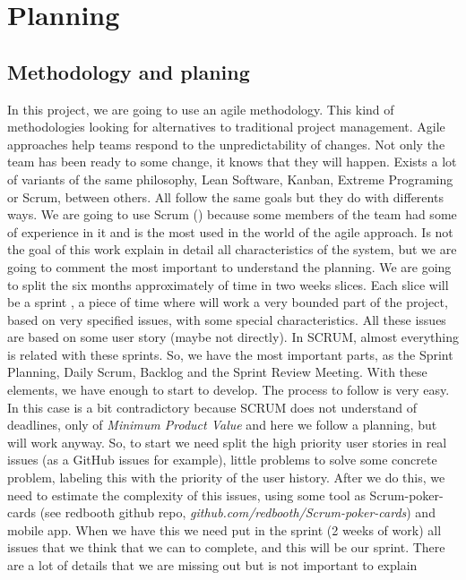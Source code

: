 \chapter{Planning}
\section{Methodology and planing}

In this project, we are going to use an agile methodology.
This kind of methodologies looking for alternatives to traditional project management.
Agile approaches help teams respond to the unpredictability of changes.
Not only the team has been ready to some change, it knows that they will happen.
\intro
Exists a lot of variants of the same philosophy, Lean Software, Kanban,
Extreme Programing or Scrum, between others.
All follow the same goals but they do with differents ways.
\intro
We are going to use Scrum (\cite{scrumbook}) because some members of the team had some of experience
in it and is the most used in the world of the agile approach.
Is not the goal of this work explain in detail all characteristics of the system,
but we are going to comment the most important to understand the planning.
\intro
We are going to split the six months approximately of time in two weeks slices.
Each slice will be a sprint , a piece of time where will work a very bounded part
of the project, based on very specified issues, with some special characteristics.
All these issues are based on some user story (maybe not directly).
\intro
In SCRUM, almost everything is related with these sprints. So, we have the most
important parts, as the Sprint Planning, Daily Scrum, Backlog and the Sprint
Review Meeting. With these elements, we have enough to start to develop.
The process to follow is very easy. In this case is a bit contradictory because
SCRUM does not understand of deadlines, only of \textit{Minimum Product Value}
and here we follow a planning, but will work anyway.
\intro
So, to start we need split the high priority user stories in real issues (as a
GitHub issues for example), little problems to solve some concrete problem,
labeling this with the priority of the user history.
After we do this, we need to estimate the complexity of this issues, using some
tool as Scrum-poker-cards (see redbooth github repo, \textit{github.com/redbooth/Scrum-poker-cards})
and mobile app.  When we have this we need put in the sprint (2 weeks of work)
all issues that we think that we can to complete, and this will be our sprint.
\intro
There are a lot of details that we are missing out but is not important to explain
